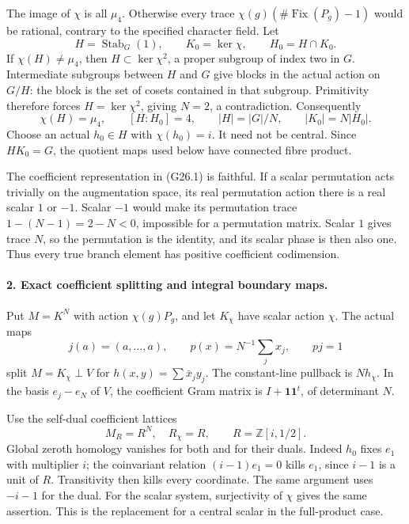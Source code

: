 The image of \(\chi\) is all \(\mu_4\). Otherwise every trace
\(\chi(g)(\#\operatorname{Fix}(P_g)-1)\) would be rational,
contrary to the specified character field. Let
\[
 H=\operatorname{Stab}_G(1),\qquad
 K_0=\ker\chi,\qquad H_0=H\cap K_0.
                                                               \tag{G26.3}
\]
If \(\chi(H)\ne\mu_4\), then \(H\subset\ker\chi^2\), a
proper subgroup of index two in \(G\). Intermediate subgroups
between \(H\) and \(G\) give blocks in the actual action on
\(G/H\): the block is the set of cosets contained in that
subgroup. Primitivity therefore forces \(H=\ker\chi^2\),
giving \(N=2\), a contradiction. Consequently
\[
 \chi(H)=\mu_4,\qquad [H:H_0]=4,\qquad
 |H|=|G|/N,\qquad |K_0|=N|H_0|.                         \tag{G26.4}
\]
Choose an actual \(h_0\in H\) with \(\chi(h_0)=i\).
It need not be central. Since \(HK_0=G\), the quotient
maps used below have connected fibre product.

The coefficient representation in (G26.1) is faithful. If a
scalar permutation acts trivially on the augmentation space,
its real permutation action there is a real scalar \(1\) or
\(-1\). Scalar \(-1\) would make its permutation trace
\(1-(N-1)=2-N<0\), impossible for a permutation matrix.
Scalar \(1\) gives trace \(N\), so the permutation is the
identity, and its scalar phase is then also one. Thus every
true branch element has positive coefficient codimension.

\paragraph{2. Exact coefficient splitting and integral boundary maps.}
Put \(M=K^N\) with action \(\chi(g)P_g\), and let
\(K_\chi\) have scalar action \(\chi\). The actual maps
\[
 j(a)=(a,\ldots,a),\qquad
 p(x)=N^{-1}\sum_jx_j,\qquad pj=1
                                                               \tag{G26.5}
\]
split \(M=K_\chi\perp V\) for \(h(x,y)=\sum\bar x_jy_j\).
The constant-line pullback is \(Nh_\chi\). In the basis
\(e_j-e_N\) of \(V\), the coefficient Gram matrix is
\(I+\boldsymbol1\boldsymbol1^t\), of determinant \(N\).

Use the self-dual coefficient lattices
\[
                  M_R=R^N,\quad R_\chi=R,\qquad
                         R=\mathbb Z[i,1/2].                \tag{G26.6}
\]
Global zeroth homology vanishes for both and for their duals.
Indeed \(h_0\) fixes \(e_1\) with multiplier \(i\); the
coinvariant relation \((i-1)e_1=0\) kills \(e_1\), since
\(i-1\) is a unit of \(R\). Transitivity then kills every
coordinate. The same argument uses \(-i-1\) for the dual.
For the scalar system, surjectivity of \(\chi\) gives the
same assertion. This is the replacement for a central
scalar in the full-product case.

